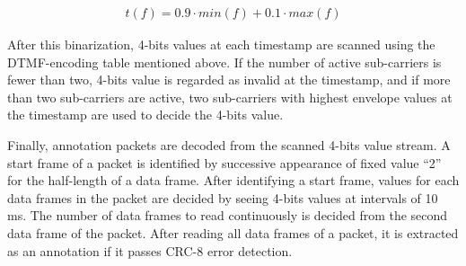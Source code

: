\begin{align}
t(f) = 0.9 \cdot min(f) + 0.1 \cdot max(f)
\end{align}

After this binarization, 4-bits values at each timestamp are scanned using the DTMF-encoding table mentioned above.
If the number of active sub-carriers is fewer than two, 4-bits value is regarded as invalid  at the timestamp, and if more than two sub-carriers are active, two sub-carriers with highest envelope values at the timestamp are used to decide the 4-bits value.

Finally, annotation packets are decoded from the scanned 4-bits value stream.
A start frame of a packet is identified by successive appearance of fixed value ``2'' for the half-length of a data frame.
After identifying a start frame, values for each data frames in the packet are decided by seeing 4-bits values at intervals of 10 ms.
The number of data frames to read continuously is decided from the second data frame of the packet.
After reading all data frames of a packet, it is extracted as an annotation if it passes CRC-8 error detection.